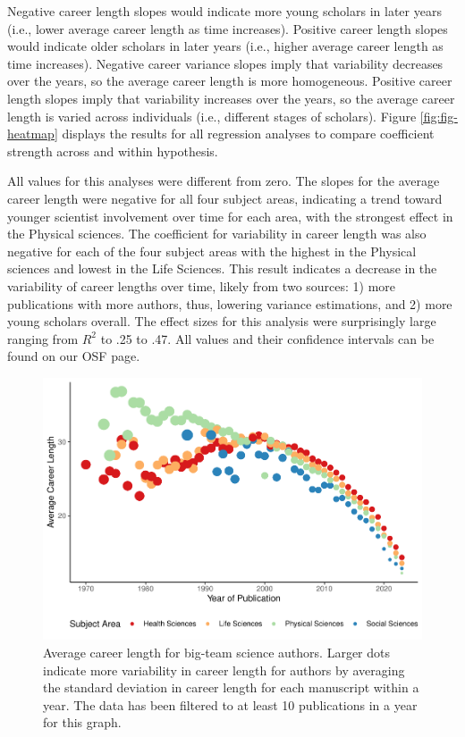 \documentclass[
  man,floatsintext]{apa6}
\begin{document}
Negative career length slopes would indicate more young scholars in later years (i.e., lower average career length as time increases). Positive career length slopes would indicate older scholars in later years (i.e., higher average career length as time increases). Negative career variance slopes imply that variability decreases over the years, so the average career length is more homogeneous. Positive career length slopes imply that variability increases over the years, so the average career length is varied across individuals (i.e., different stages of scholars). Figure \ref{fig:fig-heatmap} displays the results for all regression analyses to compare coefficient strength across and within hypothesis.

All values for this analyses were different from zero. The slopes for the average career length were negative for all four subject areas, indicating a trend toward younger scientist involvement over time for each area, with the strongest effect in the Physical sciences. The coefficient for variability in career length was also negative for each of the four subject areas with the highest in the Physical sciences and lowest in the Life Sciences. This result indicates a decrease in the variability of career lengths over time, likely from two sources: 1) more publications with more authors, thus, lowering variance estimations, and 2) more young scholars overall. The effect sizes for this analysis were surprisingly large ranging from \(R^2\) to .25 to .47. All values and their confidence intervals can be found on our OSF page.

\begin{figure}
\centering
\includegraphics{manuscript_scopus_files/figure-latex/fig-career-1.pdf}
\caption{\label{fig:fig-career}Average career length for big-team science authors. Larger dots indicate more variability in career length for authors by averaging the standard deviation in career length for each manuscript within a year. The data has been filtered to at least 10 publications in a year for this graph.}
\end{figure}
\end{document}
